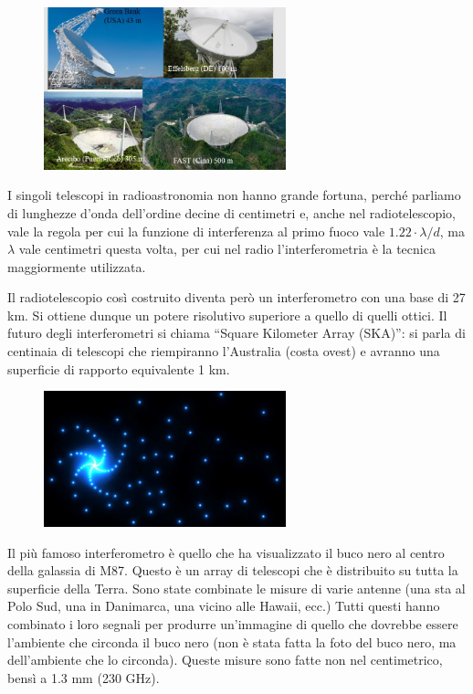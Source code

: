 \begin{figure}[H]
    \centering
    \includegraphics[width=7cm]{32.jpg}
\end{figure}

I singoli telescopi in radioastronomia non hanno grande fortuna, perché parliamo di lunghezze d'onda dell'ordine decine di centimetri e, anche nel radiotelescopio, vale la regola per cui la funzione di interferenza al primo fuoco vale $1.22 \cdot {\lambda}/d$, ma ${\lambda}$ vale centimetri questa volta, per cui nel radio l'interferometria è la tecnica maggiormente utilizzata.

Il radiotelescopio così costruito diventa però un interferometro con una base di 27 km. Si ottiene dunque un potere risolutivo superiore a quello di quelli ottici. Il futuro degli interferometri si chiama “Square Kilometer Array (SKA)”: si parla di centinaia di telescopi che riempiranno l'Australia (costa ovest) e avranno una superficie di rapporto equivalente 1 km. 

\begin{figure}[H]
    \centering
    \includegraphics[width=7cm]{33.jpg}
\end{figure}

Il più famoso interferometro è quello che ha visualizzato il buco nero al centro della galassia di M87. Questo è un array di telescopi che è distribuito su tutta la superficie della Terra. Sono state combinate le misure di varie antenne (una sta al Polo Sud, una in Danimarca, una vicino alle Hawaii, ecc.) Tutti questi hanno combinato i loro segnali per produrre un'immagine di quello che dovrebbe essere l'ambiente che circonda il buco nero (non è stata fatta la foto del buco nero, ma dell'ambiente che lo circonda). Queste misure sono fatte non nel centimetrico, bensì a 1.3 mm (230 GHz).

